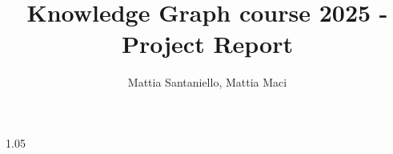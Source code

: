 \documentclass{knowdive}
\title{Knowledge Graph course 2025 - Project Report }
\author{Mattia Santaniello, Mattia Maci}
\begin{document}
\maketitle
\begin{sloppypar}
\large
\begin{spacing}{1.05}






%



% 













\end{spacing}
\end{sloppypar}
\end{document}
